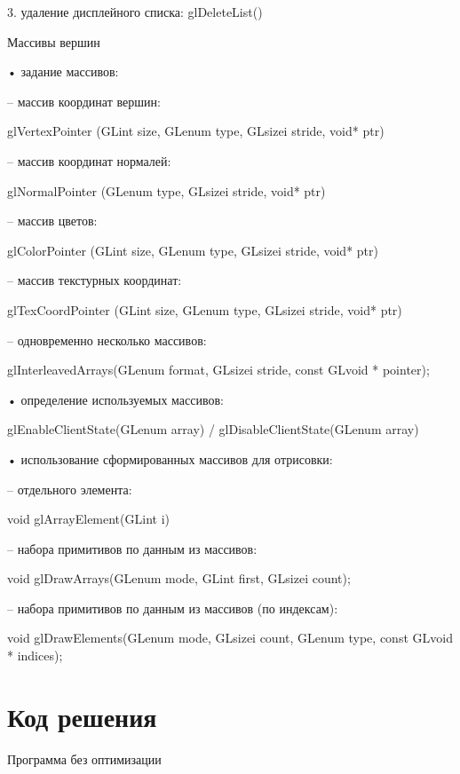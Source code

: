 \documentclass[a4paper, 14pt]{extarticle}
\begin{document}
3. удаление дисплейного списка: glDeleteList()

\begin{center}
\Large {Массивы вершин} \\ 
\end{center}\normalsize

• задание массивов:

    – массив координат вершин:
    
    glVertexPointer (GLint size, GLenum type, GLsizei stride, void* ptr)
    
    – массив координат нормалей:
    
    glNormalPointer (GLenum type, GLsizei stride, void* ptr)
    
    – массив цветов:
    
    glColorPointer (GLint size, GLenum type, GLsizei stride, void* ptr)
    
    – массив текстурных координат:
    
    glTexCoordPointer (GLint size, GLenum type, GLsizei stride, void* ptr)
    
    – одновременно несколько массивов:
    
    glInterleavedArrays(GLenum format, GLsizei stride, const GLvoid * pointer);
    
    • определение используемых массивов:
    
    glEnableClientState(GLenum array) / glDisableClientState(GLenum array)
    
    • использование сформированных массивов для отрисовки:
    
    – отдельного элемента:
    
    void glArrayElement(GLint i)
    
    – набора примитивов по данным из массивов:
    
    void glDrawArrays(GLenum mode, GLint first, GLsizei count);
    
    – набора примитивов по данным из массивов (по индексам):
    
    void glDrawElements(GLenum mode, GLsizei count, GLenum type, const GLvoid * indices);

\pagebreak
\section{Код решения}

\begin{center}
\Large {Программа без оптимизации} \\ 
\end{center}\normalsize
\end{document}
